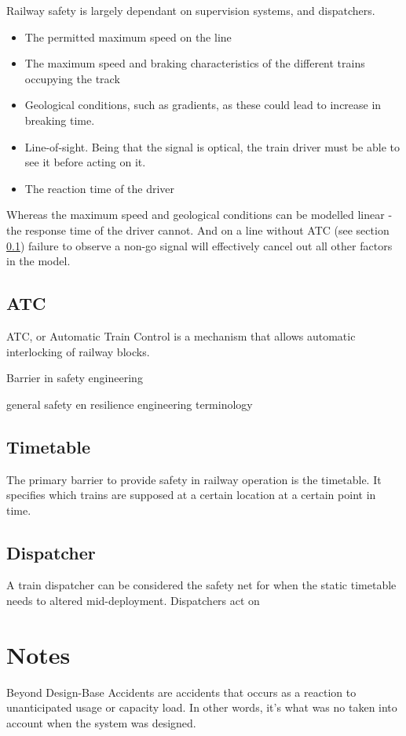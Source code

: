 Railway safety is largely dependant on supervision systems, and dispatchers.

\begin{itemize}
  \item The permitted maximum speed on the line
  \item The maximum speed and braking characteristics of the different trains occupying the track
  \item Geological conditions, such as gradients, as these could lead to increase in breaking time.
  \item Line-of-sight. Being that the signal is optical, the train driver must be able to see it before acting on it.
  \item The reaction time of the driver
\end{itemize}
Whereas the maximum speed and geological conditions can be modelled linear - the response time of the driver cannot. And on a line without ATC (see section \ref{sec:atc}) failure to observe a non-go signal will effectively cancel out all other factors in the model.

\subsection{ATC}
\label{sec:atc}
ATC, or Automatic Train Control is a mechanism that allows automatic interlocking of railway blocks.

Barrier in safety engineering

general safety en resilience engineering terminology




\subsection{Timetable}
The primary barrier to provide safety in railway operation is the timetable. It specifies which trains are supposed at a certain location at a certain point in time.

\subsection{Dispatcher}
A train dispatcher can be considered the safety net for when the static timetable needs to altered mid-deployment.
Dispatchers act on





\section{Notes}
Beyond Design-Base Accidents are accidents that occurs as a reaction to unanticipated usage or capacity load. In other words, it's what was no taken into account when the system was designed.

